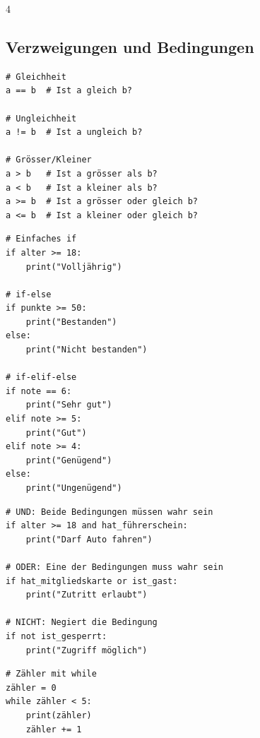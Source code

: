 \begin{landscape}
\begin{multicols*}{4}
		\columnbreak\textcolor{\cheatSheetColor}{\subsection*{Verzweigungen und Bedingungen}}

		\begin{cheatSheetBox}[title=Vergleichsoperatoren]
			\begin{lstlisting}
# Gleichheit
a == b  # Ist a gleich b?

# Ungleichheit
a != b  # Ist a ungleich b?

# Grösser/Kleiner
a > b   # Ist a grösser als b?
a < b   # Ist a kleiner als b?
a >= b  # Ist a grösser oder gleich b?
a <= b  # Ist a kleiner oder gleich b?
\end{lstlisting}
		\end{cheatSheetBox}

		\begin{cheatSheetBox}[title={if, elif, else}]
			\begin{lstlisting}
# Einfaches if
if alter >= 18:
    print("Volljährig")

# if-else
if punkte >= 50:
    print("Bestanden")
else:
    print("Nicht bestanden")

# if-elif-else
if note == 6:
    print("Sehr gut")
elif note >= 5:
    print("Gut")
elif note >= 4:
    print("Genügend")
else:
    print("Ungenügend")
\end{lstlisting}
		\end{cheatSheetBox}

		\begin{cheatSheetBox}[title=Logische Operatoren]
			\begin{lstlisting}
# UND: Beide Bedingungen müssen wahr sein
if alter >= 18 and hat_führerschein:
    print("Darf Auto fahren")

# ODER: Eine der Bedingungen muss wahr sein
if hat_mitgliedskarte or ist_gast:
    print("Zutritt erlaubt")

# NICHT: Negiert die Bedingung
if not ist_gesperrt:
    print("Zugriff möglich")
\end{lstlisting}
		\end{cheatSheetBox}

		\begin{cheatSheetBox}[title=while-Schleife]
			\begin{lstlisting}
# Zähler mit while
zähler = 0
while zähler < 5:
    print(zähler)
    zähler += 1


\end{lstlisting}
\end{cheatSheetBox}
\end{multicols*}
\end{landscape}
